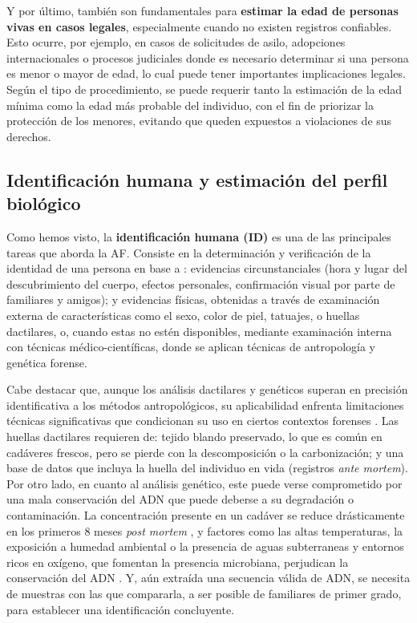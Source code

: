 Y por último, también son fundamentales para \textbf{estimar la edad de personas vivas en casos legales}, especialmente cuando no existen registros confiables. Esto ocurre, por ejemplo, en casos de solicitudes de asilo, adopciones internacionales o procesos judiciales donde es necesario determinar si una persona es menor o mayor de edad, lo cual puede tener importantes implicaciones legales. Según el tipo de procedimiento, se puede requerir tanto la estimación de la edad mínima como la edad más probable del individuo, con el fin de priorizar la protección de los menores, evitando que queden expuestos a violaciones de sus derechos.


\subsection{Identificación humana y estimación del perfil biológico}

Como hemos visto, la \textbf{identificación humana (\acrshort{ID})} es una de las principales tareas que aborda la \acrshort{AF}. Consiste en la determinación y verificación de la identidad de una persona en base a \cite{thompson2006}: evidencias circunstanciales (hora y lugar del descubrimiento del cuerpo, efectos personales, confirmación visual por parte de familiares y amigos); y evidencias físicas, obtenidas a través de examinación externa de características como el sexo, color de piel, tatuajes, o huellas dactilares, o, cuando estas no estén disponibles, mediante examinación interna con técnicas médico-científicas, donde se aplican técnicas de antropología y genética forense.

Cabe destacar que, aunque los análisis dactilares y genéticos superan en precisión identificativa a los métodos antropológicos, su aplicabilidad enfrenta limitaciones técnicas significativas que condicionan su uso en ciertos contextos forenses \cite{beauthier2009}. Las huellas dactilares requieren de: tejido blando preservado, lo que es común en cadáveres frescos, pero se pierde con la descomposición o la carbonización; y una base de datos que incluya la huella del individuo en vida (registros \textit{ante mortem}). Por otro lado, en cuanto al análisis genético, este puede verse comprometido por una mala conservación del ADN que puede deberse a su degradación o contaminación. La concentración presente en un cadáver se reduce drásticamente en los primeros 8 meses \textit{post mortem} \cite{higgins2015}, y factores como las altas temperaturas, la exposición a humedad ambiental o la presencia de aguas subterraneas y entornos ricos en oxígeno, que fomentan la presencia microbiana, perjudican la conservación del ADN \cite{latham2018}. Y, aún extraída una secuencia válida de ADN, se necesita de muestras con las que compararla, a ser posible de familiares de primer grado, para establecer una identificación concluyente. 

